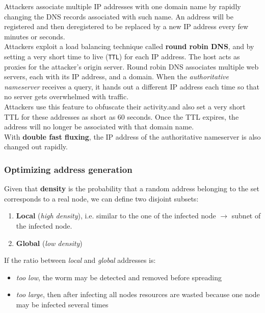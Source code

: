 Attackers associate multiple IP addresses with one domain name by rapidly
changing the DNS records associated with such name.
An address will be registered and then deregistered to be replaced by a new IP address every few minutes or seconds.\\
Attackers exploit a load balancing technique called \textbf{round robin DNS}, and by
setting a very short time to live (\texttt{TTL}) for each IP address. 
The host acts
as proxies for the attacker's origin server.
Round robin DNS associates multiple web servers, each with its IP address, and a domain.
When the \textit{authoritative nameserver} receives a query, it hands out a
different IP address each time so that no server gets overwhelmed with traffic.\\
Attackers use this feature to obfuscate their activity.and also set a very short TTL
for these addresses as short as 60 seconds. Once the TTL expires, the address
will no longer be associated with that domain name.\\
With \textbf{double fast fluxing}, the IP address of the authoritative nameserver is also
changed out rapidly.

\subsubsection{Optimizing address generation}
Given that \textbf{density} is the probability that a random address belonging to the set corresponds to a real node,
we can define two disjoint subsets:
\begin{enumerate}
   \item \textbf{Local} (\textit{high density}), i.e. similar to the one of the infected
   node $\longrightarrow$ subnet of the infected node.
   \item \textbf{Global} (\textit{low density})
\end{enumerate}
If the ratio between \textit{local} and \textit{global} addresses is:
\begin{itemize}
   \item \textit{too low},
   the worm may be detected and removed before
   spreading
   \item \textit{too large},
   then after infecting all nodes resources are
   wasted because one node may be infected several times
\end{itemize}

